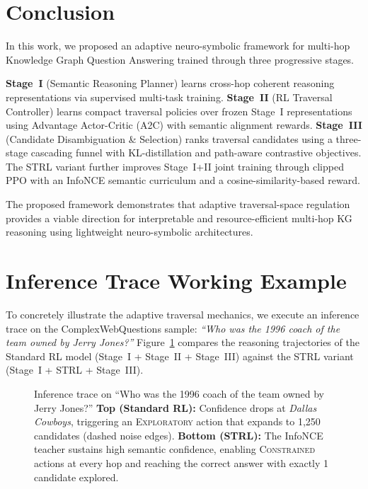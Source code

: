 \documentclass[10pt,conference]{IEEEtran}
\begin{document}
\section{Conclusion}

In this work, we proposed an adaptive neuro-symbolic framework for multi-hop Knowledge Graph Question Answering trained through three progressive stages.

\textbf{Stage~I} (Semantic Reasoning Planner) learns cross-hop coherent reasoning representations via supervised multi-task training. \textbf{Stage~II} (RL Traversal Controller) learns compact traversal policies over frozen Stage~I representations using Advantage Actor-Critic (A2C) with semantic alignment rewards. \textbf{Stage~III} (Candidate Disambiguation \& Selection) ranks traversal candidates using a three-stage cascading funnel with KL-distillation and path-aware contrastive objectives. The STRL variant further improves Stage~I+II joint training through clipped PPO with an InfoNCE semantic curriculum and a cosine-similarity-based reward.

The proposed framework demonstrates that adaptive traversal-space regulation provides a viable direction for interpretable and resource-efficient multi-hop KG reasoning using lightweight neuro-symbolic architectures.


\appendix
\section{Inference Trace Working Example}
\label{app:working_example}

To concretely illustrate the adaptive traversal mechanics, we execute an inference trace on the ComplexWebQuestions sample: \textit{``Who was the 1996 coach of the team owned by Jerry Jones?''} Figure~\ref{fig:working_example} compares the reasoning trajectories of the Standard RL model (Stage~I + Stage~II + Stage~III) against the STRL variant (Stage~I + STRL + Stage~III).

\begin{figure}[htbp]
\centering

\caption{Inference trace on ``Who was the 1996 coach of the team owned by Jerry Jones?'' \textbf{Top (Standard RL):} Confidence drops at \textit{Dallas Cowboys}, triggering an \textsc{Exploratory} action that expands to 1,250 candidates (dashed noise edges). \textbf{Bottom (STRL):} The InfoNCE teacher sustains high semantic confidence, enabling \textsc{Constrained} actions at every hop and reaching the correct answer with exactly 1 candidate explored.}
\label{fig:working_example}
\end{figure}
\end{document}
